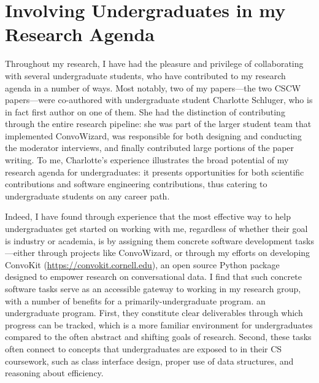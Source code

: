 \documentclass[12pt,letterpaper]{article}
\begin{document}
\section{Involving Undergraduates in my Research Agenda}
Throughout my research, I have had the pleasure and privilege of collaborating with several undergraduate students, who have contributed to my research agenda in a number of ways.
Most notably, two of my papers---the two CSCW papers---were co-authored with undergraduate student Charlotte Schluger, who is in fact first author on one of them.
She had the distinction of contributing through the entire research pipeline: she was part of the larger student team that implemented ConvoWizard, was responsible for both designing and conducting the moderator interviews, and finally contributed large portions of the paper writing.
To me, Charlotte's experience illustrates the broad potential of my research agenda for undergraduates: it presents opportunities for both scientific contributions and software engineering contributions, thus catering to undergraduate students on any career path.

Indeed, I have found through experience that the most effective way to help undergraduates get started on working with me, regardless of whether their goal is industry or academia, is by assigning them concrete software development tasks---either through projects like ConvoWizard, or through my efforts on developing ConvoKit (\url{https://convokit.cornell.edu}), an open source Python package designed to empower research on conversational data.
I find that such concrete software tasks serve as an accessible gateway to working in my research group, with a number of benefits for 
\ifliberalarts
a primarily-undergraduate program.
\else
an undergraduate program.
\fi
First, they constitute clear deliverables through which progress can be tracked, which is a more familiar environment for undergraduates compared to the often abstract and shifting goals of research.
Second, these tasks often connect to concepts that undergraduates are exposed to in their CS coursework, such as class interface design, proper use of data structures, and reasoning about efficiency.
\end{document}
